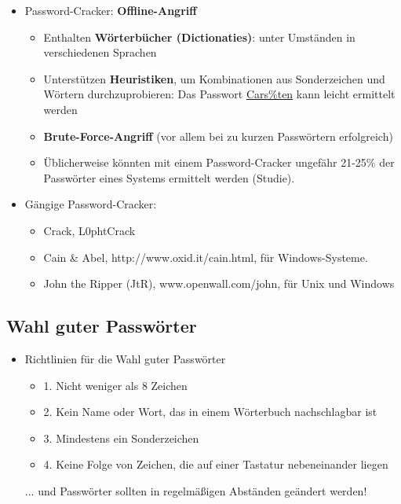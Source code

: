 \documentclass[openany]{book}
\begin{document}
\begin{itemize}
    \item Password-Cracker: \textbf{Offline-Angriff}
    \begin{itemize}
        \item Enthalten \textbf{Wörterbücher (Dictionaties)}: unter Umständen in verschiedenen Sprachen
        \item Unterstützen \textbf{Heuristiken}, um Kombinationen aus Sonderzeichen und Wörtern durchzuprobieren: Das Passwort \underline{Cars\%ten} kann leicht ermittelt werden
        \item \textbf{Brute-Force-Angriff} (vor allem bei zu kurzen Passwörtern erfolgreich)
        \item Üblicherweise könnten mit einem Password-Cracker ungefähr 21-25\% der Passwörter eines Systems ermittelt werden (Studie).
    \end{itemize}
    \item Gängige Password-Cracker:
    \begin{itemize}
        \item Crack, L0phtCrack
        \item Cain \& Abel, http://www.oxid.it/cain.html, für Windows-Systeme.
        \item John the Ripper (JtR), www.openwall.com/john, für Unix und Windows
    \end{itemize}
\end{itemize}

\subsection{Wahl guter Passwörter}

\begin{itemize}
    \item Richtlinien für die Wahl guter Passwörter
    \begin{itemize}
        \item 1. Nicht weniger als 8 Zeichen
        \item 2. Kein Name oder Wort, das in einem Wörterbuch nachschlagbar ist
        \item 3. Mindestens ein Sonderzeichen
        \item 4. Keine Folge von Zeichen, die auf einer Tastatur nebeneinander liegen
    \end{itemize}
    ... und Passwörter sollten in regelmäßigen Abständen geändert werden!
\end{itemize}
\end{document}
